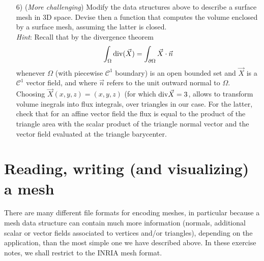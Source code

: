 \documentclass[a4paper,12pt]{article}
\begin{document}
\begin{itemize}
\item[6)] ({\it More challenging}) Modify the data structures above to describe a surface mesh in 3D space. Devise then a function that computes the volume enclosed by a surface mesh, assuming the latter is closed.\\
{\it Hint}: Recall that by the divergence theorem 
$$\int_\Omega {\rm div}( \vec X) = \int_{\partial\Omega} \vec X \cdot \vec n$$
whenever $\Omega$ (with piecewise $\mathcal{C}^1$ boundary) is an open bounded set and
$\vec X$ is a $\mathcal{C}^1$ vector field, and where $\vec n$ refers to the unit outward normal 
to $\Omega.$ Choosing $\vec X(x,y,z) = (x,y,z)$ (for which ${\rm div}\vec X =
3$, allows to transform volume inegrals into flux integrals, over triangles in our case. For the latter, check that for an affine vector field the flux is equal to the product of the triangle area with the scalar product of the triangle normal vector and the vector field evaluated at the triangle barycenter.

\end{itemize}

\section{Reading, writing (and visualizing) a mesh}

There are many different file formats for encoding meshes, in particular because a mesh data structure can contain much more information (normals, additional scalar or vector fields associated to vertices and/or triangles), depending on the application, than the most simple one we have described above. In these exercise notes, we shall restrict to the INRIA mesh format.
\end{document}
